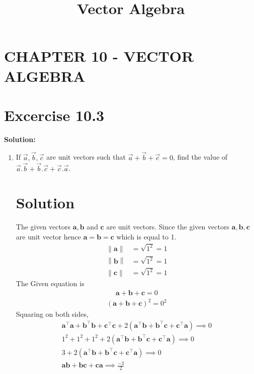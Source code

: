 \documentclass[12pt]{article}
\let\vec\mathbf
\providecommand{\norm}[1]{\left\lVert#1\right\rVert}
\newcommand{\solution}{\noindent \textbf{Solution: }}
\let\vec\mathbf
\begin{document}
\begin{center}
\title{\textbf{Vector Algebra}}
\date{\vspace{-5ex}} %
\maketitle
\end{center}
\setcounter{page}{1}
\section*{CHAPTER 10 - VECTOR ALGEBRA}
\section*{Excercise 10.3}
\solution 
\begin{enumerate}
\item If $\overrightarrow{a},\overrightarrow{b},\overrightarrow{c}$ are unit vectors such that $\overrightarrow{a}+\overrightarrow{b}+\overrightarrow{c}=0$, find the value of $\overrightarrow{a}.\overrightarrow{b}+\overrightarrow{b}.\overrightarrow{c}+\overrightarrow{c}.\overrightarrow{a}$.  
\section{Solution}
The given vectors $\vec{a},\vec{b}$ and $\vec{c}$ are unit vectors. Since the given vectors $\vec{a},\vec{b},\vec{c}$ are unit vector hence $\vec{a}=\vec{b}=\vec{c}$ which is equal to 1.
        \begin{align}
\norm{\vec{a}} &=\sqrt{1^2}=1\\ \norm{\vec{b}}&=\sqrt{1^2}=1\\ \norm{\vec{c}}&=\sqrt{1^2}=1
        \end{align}
The Given equation is 
        \begin{align}
\vec{a}+\vec{b}+\vec{c}=0
\end{align}      
\begin{align}
({\vec{a}+{\vec{b}}+{\vec{c}}})^2=0^2
\end{align}
Squaring on both sides,
\begin{align}
{\vec{a}^\top\vec{a}}+{\vec{b}^\top\vec{b}}+{\vec{c}^\top\vec{c}}+2({{\vec{a}^\top}{\vec{b}}+{\vec{b}^\top}{\vec{c}}+{\vec{c}^\top}{\vec{a}}})\implies0\\
{1}^2+{1}^2+{1}^2+2({{\vec{a}^\top}{\vec{b}}+{\vec{b}^\top}{\vec{c}}+{\vec{c}^\top}{\vec{a}}})\implies0\\
3+2({{\vec{a}^\top}{\vec{b}}+{\vec{b}^\top}{\vec{c}}+{\vec{c}^\top}{\vec{a}}})\implies0\\
{\vec{a}}{\vec{b}}+{\vec{b}}{\vec{c}}+{\vec{c}}{\vec{a}}\implies\frac{-3}{2}
\end{align}
\end{enumerate}
\end{document}
